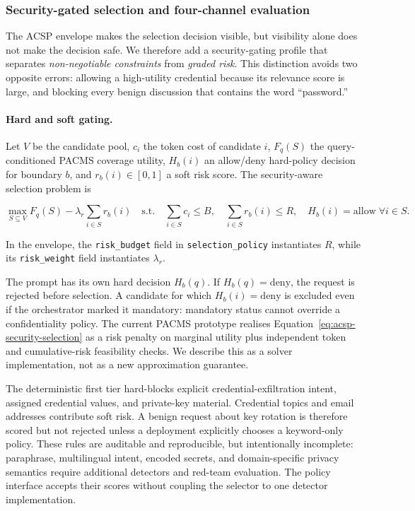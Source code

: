\subsubsection{Security-gated selection and four-channel evaluation}
\label{sec:proposals:acsp:security-eval}

The ACSP envelope makes the selection decision visible,
but visibility alone does not make the decision safe. We
therefore add a security-gating profile that separates
\emph{non-negotiable constraints} from \emph{graded risk}.
This distinction avoids two opposite errors: allowing a
high-utility credential because its relevance score is
large, and blocking every benign discussion that contains
the word ``password.''

\paragraph{Hard and soft gating.}
Let $V$ be the candidate pool, $c_i$ the token cost of
candidate $i$, $F_q(S)$ the query-conditioned PACMS
coverage utility, $H_b(i)$ an allow/deny hard-policy
decision for boundary $b$, and $r_b(i) \in [0,1]$ a soft
risk score. The security-aware selection problem is

\begin{equation}
  \max_{S \subseteq V}
    F_q(S) - \lambda_r \sum_{i \in S} r_b(i)
  \quad \text{s.t.} \quad
    \sum_{i \in S} c_i \leq B,\quad
    \sum_{i \in S} r_b(i) \leq R,\quad
    H_b(i)=\mathrm{allow}\;\forall i\in S.
  \label{eq:acsp-security-selection}
\end{equation}

In the envelope, the \texttt{risk\_budget} field in
\texttt{selection\_policy} instantiates $R$, while its
\texttt{risk\_weight} field instantiates $\lambda_r$.

The prompt has its own hard decision $H_b(q)$. If
$H_b(q)=\mathrm{deny}$, the request is rejected before selection. A
candidate for which $H_b(i)=\mathrm{deny}$ is excluded even if the
orchestrator marked it mandatory: mandatory status cannot
override a confidentiality policy. The current PACMS
prototype realises Equation~\ref{eq:acsp-security-selection}
as a risk penalty on marginal utility plus independent
token and cumulative-risk feasibility checks. We describe
this as a solver implementation, not as a new approximation
guarantee.

The deterministic first tier hard-blocks explicit
credential-exfiltration intent, assigned credential values,
and private-key material. Credential topics and email
addresses contribute soft risk. A benign request about key
rotation is therefore scored but not rejected unless a
deployment explicitly chooses a keyword-only policy. These
rules are auditable and reproducible, but intentionally
incomplete: paraphrase, multilingual intent, encoded
secrets, and domain-specific privacy semantics require
additional detectors and red-team evaluation. The policy
interface accepts their scores without coupling the
selector to one detector implementation.

